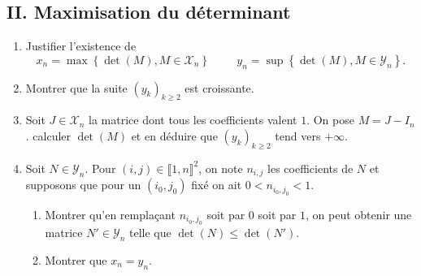 \subsection*{II. Maximisation du déterminant}
\begin{enumerate}
  \item Justifier l'existence de
\begin{displaymath}
  x_n = \max\left\lbrace \det(M), M\in \mathcal{X}_n\right\rbrace 
  \hspace{1cm}
  y_n = \sup\left\lbrace \det(M), M\in \mathcal{Y}_n\right\rbrace .
\end{displaymath}
  \item Montrer que la suite $\left( y_k\right)_{k\geq 2}$ est croissante.
  \item Soit $J\in \mathcal{X}_n$ la matrice dont tous les coefficients valent $1$. On pose $M = J -I_n$. calculer $\det(M)$ et en déduire que $\left( y_k\right)_{k\geq 2}$ tend vers $+\infty$.
  \item Soit $N\in \mathcal{Y}_n$. Pour $(i,j)\in \llbracket 1,n \rrbracket ^2$, on note $n_{i,j}$ les coefficients de $N$ et supposons que pour un $(i_0,j_0)$ fixé on ait $0 < n_{i_0, j_0} < 1$.
  \begin{enumerate}
    \item Montrer qu'en remplaçant $n_{i_0, j_0}$ soit par $0$ soit par $1$, on peut obtenir une matrice $N'\in \mathcal{Y}_n$ telle que $\det(N) \leq \det(N')$.
    \item Montrer que $x_n = y_n$.
  \end{enumerate}
\end{enumerate}


